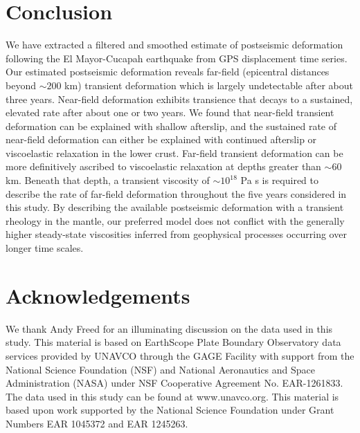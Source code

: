 \documentclass[draft,linenumbers]{AGUJournal}
\begin{document}
\section{Conclusion}

We have extracted a filtered and smoothed estimate of postseismic deformation following the El Mayor-Cucapah earthquake from GPS displacement time series.  Our estimated postseismic deformation reveals far-field (epicentral distances beyond ${\sim}200$ km) transient deformation which is largely undetectable after about three years. Near-field deformation exhibits transience that decays to a sustained, elevated rate after about one or two years.  We found that near-field transient deformation can be explained with shallow afterslip, and the sustained rate of near-field deformation can either be explained with continued afterslip or viscoelastic relaxation in the lower crust.  Far-field transient deformation can be more definitively ascribed to viscoelastic relaxation at depths greater than ${\sim}60$ km. Beneath that depth, a transient viscosity of ${\sim}10^{18}$ Pa s is required to describe the rate of far-field deformation throughout the five years considered in this study.  By describing the available postseismic deformation with a transient rheology in the mantle, our preferred model does not conflict with the generally higher steady-state viscosities inferred from geophysical processes occurring over longer time scales.

\section*{Acknowledgements}
We thank Andy Freed for an illuminating discussion on the data used in this study.  This material is based on EarthScope Plate Boundary Observatory data services provided by UNAVCO through the GAGE Facility with support from the National Science Foundation (NSF) and National Aeronautics and Space Administration (NASA) under NSF Cooperative Agreement No. EAR-1261833.  The data used in this study can be found at www.unavco.org. This material is based upon work supported by the National Science Foundation under Grant Numbers EAR 1045372 and EAR 1245263.


%
%
%
%
%
%
\end{document}
